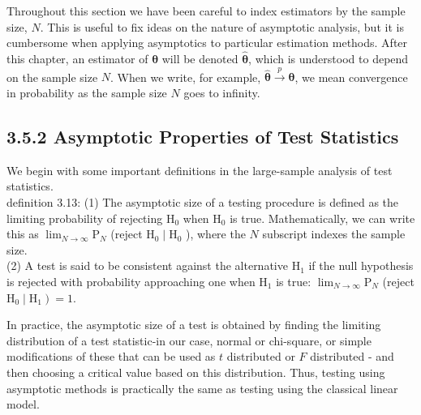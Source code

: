 \documentclass[10pt]{article}
\begin{document}
Throughout this section we have been careful to index estimators by the sample size, $N$. This is useful to fix ideas on the nature of asymptotic analysis, but it is cumbersome when applying asymptotics to particular estimation methods. After this chapter, an estimator of $\boldsymbol{\theta}$ will be denoted $\hat{\boldsymbol{\theta}}$, which is understood to depend on the sample size $N$. When we write, for example, $\hat{\boldsymbol{\theta}} \xrightarrow{p} \boldsymbol{\theta}$, we mean convergence in probability as the sample size $N$ goes to infinity.

\subsection*{3.5.2 Asymptotic Properties of Test Statistics}
We begin with some important definitions in the large-sample analysis of test statistics.\\
definition 3.13: (1) The asymptotic size of a testing procedure is defined as the limiting probability of rejecting $\mathrm{H}_{0}$ when $\mathrm{H}_{0}$ is true. Mathematically, we can write this as $\lim _{N \rightarrow \infty} \mathrm{P}_{N}$ (reject $\mathrm{H}_{0} \mid \mathrm{H}_{0}$ ), where the $N$ subscript indexes the sample size.\\
(2) A test is said to be consistent against the alternative $\mathrm{H}_{1}$ if the null hypothesis is rejected with probability approaching one when $\mathrm{H}_{1}$ is true: $\lim _{N \rightarrow \infty} \mathrm{P}_{N}$ (reject $\left.\mathrm{H}_{0} \mid \mathrm{H}_{1}\right)=1$.

In practice, the asymptotic size of a test is obtained by finding the limiting distribution of a test statistic-in our case, normal or chi-square, or simple modifications of these that can be used as $t$ distributed or $F$ distributed - and then choosing a critical value based on this distribution. Thus, testing using asymptotic methods is practically the same as testing using the classical linear model.
\end{document}
